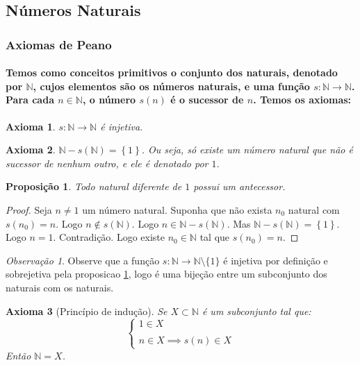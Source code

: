 \documentclass{article}
\newtheorem{axioma}{Axioma}
\newtheorem{prop}{Proposição}[section]
\theoremstyle{theorem}
\theoremstyle{lemma}
\theoremstyle{definition}
\theoremstyle{remark}
\newtheorem{obs}{Observação}[section]
\begin{document}
\subsection{Números Naturais}
\subsubsection{Axiomas de Peano}
\paragraph{Temos como conceitos primitivos o conjunto dos naturais, denotado por $\mathbb{N}$, cujos elementos são os números naturais, e uma função $s:\mathbb{N} \to \mathbb{N}$. Para cada $n\in \mathbb{N}$, o número $s(n)$ é o sucessor de $n$.  Temos os axiomas:}
\begin{axioma}
	$s:\mathbb{N} \to \mathbb{N}$ é injetiva.
\end{axioma}
\begin{axioma}
	$\mathbb{N} - s(\mathbb{N}) = \left\{ 1 \right\}$. Ou seja, só existe um número natural que não é sucessor de nenhum outro, e ele é denotado por $1$.
\end{axioma}
\begin{prop}
	\label{propsuc}
	Todo natural diferente de $1$ possui um antecessor.
\end{prop}
\begin{proof}
	Seja $n\neq 1$ um número natural. Suponha que não exista $n_0$ natural com $s(n_0) = n$. Logo $n \not \in s\left(\mathbb{N}\right)$. Logo $n\in \mathbb{N} - s(\mathbb{N})$. Mas $\mathbb{N} - s(\mathbb{N}) = \left\{ 1 \right\}$. Logo $n = 1$. Contradição. Logo existe  $n_0\in \mathbb{N}$ tal que $s(n_0) = n$.
\end{proof}
\begin{obs}
	Observe que a função $s: \mathbb{N} \to \mathbb{N}\setminus \{1\}$ é injetiva por definição e sobrejetiva pela proposicao \ref{propsuc}, logo é uma bijeção entre um subconjunto dos naturais com os naturais.
\end{obs}
\begin{axioma}[Princípio de indução]
	Se $X\subset \mathbb{N}$ é  um subconjunto tal que: 
	$$
	\begin{cases}
		1 \in X\\~\\
		n \in X \implies s(n) \in X
	\end{cases}
	$$
	Então $\mathbb{N} = X$.
\end{axioma}
\end{document}
